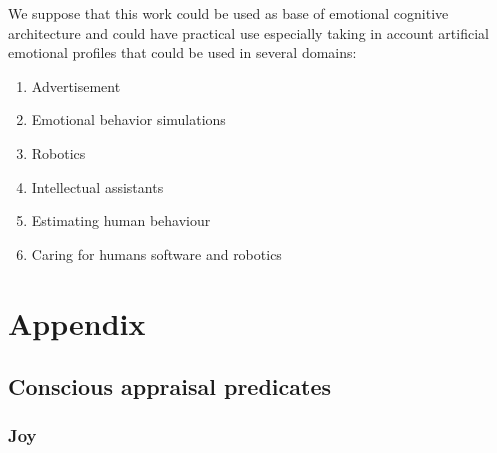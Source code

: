 We suppose that this work could be used as base of emotional cognitive architecture and could have practical use especially taking in account artificial emotional profiles that could be used in several domains:

\begin{enumerate}
	\item  Advertisement
	\item  Emotional behavior simulations
	\item  Robotics
	\item  Intellectual assistants
	\item  Estimating human behaviour
	\item  Caring for humans software and robotics
\end{enumerate}

\section{Appendix}

\subsection{Conscious appraisal predicates}

\subsubsection{Joy}

